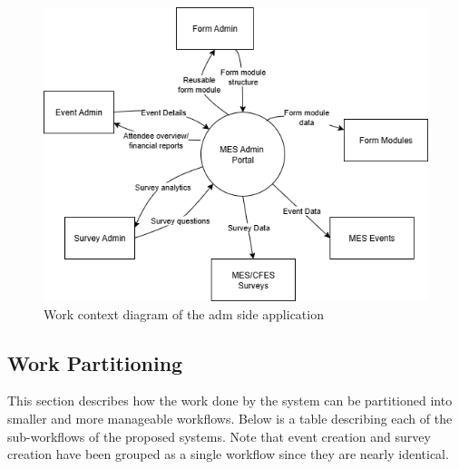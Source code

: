 \documentclass[12pt]{article}
\begin{document}
\begin{center}
\begin{figure}[H]
    \centering
    \includegraphics[width=1\linewidth]{images/work_context_admin.png}
    \caption{Work context diagram of the \gls{adm} side application}\label{fig:workcontextadmin}
\end{figure}
\end{center}

\subsection{Work Partitioning}

This section describes how the work done by the system can be partitioned into smaller and more manageable workflows.
Below is a table describing each of the sub-workflows of the proposed systems. Note that event creation and survey
creation have been grouped as a single workflow since they are nearly identical.
\end{document}
